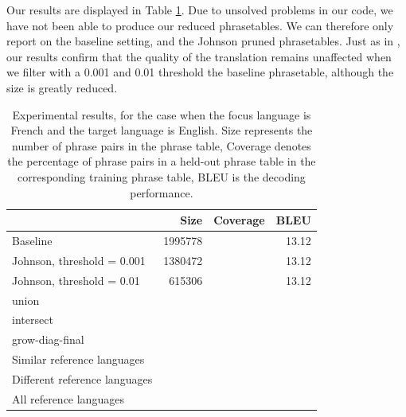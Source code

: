 \documentclass[11pt]{article}
\begin{document}
Our results are displayed in Table \ref{t:allResults}. Due to unsolved problems in our code, we have not been able to produce our reduced phrasetables.
 We can therefore only report on the baseline setting, and the Johnson pruned phrasetables.
 Just as in \cite{Johnson}, our results confirm that the quality of the translation remains unaffected when we filter with a 0.001 and 0.01 threshold the baseline phrasetable, although the size is greatly reduced.








\begin{table}[t]
\center
\begin{tabular}{p{.3\linewidth} | r r r }
&Size& Coverage & BLEU \\\hline\hline
Baseline &1995778&&13.12	\\\hline
Johnson, threshold = 0.001&1380472&&13.12	\\
Johnson, threshold = 0.01&615306&&13.12	\\
\hline
union		\\
intersect	\\
grow-diag-final	\\\hline
Similar reference languages	\\
Different reference languages 	\\
All reference languages		\\\hline
\end{tabular}

\caption{Experimental results, for the case when the focus language is French and the target language is English. Size represents the number of phrase pairs in the phrase table, Coverage denotes the percentage of phrase pairs in a held-out phrase table in the corresponding training phrase table, BLEU is the decoding performance.}
\label{t:allResults}
\end{table}
\end{document}
